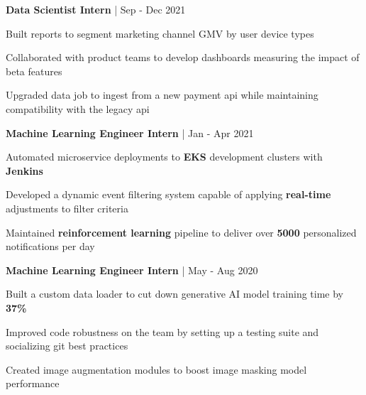 \begin{cventries}

\cventry
{\textbf{Data Scientist Intern} | \color{awesome}{Shopify}}
{Sep - Dec 2021} %
{ %
\begin{cvitems}
\item {Built reports to segment marketing channel GMV by user device types}
\item {Collaborated with product teams to develop dashboards measuring the impact of beta features}
\item {Upgraded data job to ingest from a new payment api while maintaining compatibility with the legacy api}
\end{cvitems}
}

\cventry
{\textbf{Machine Learning Engineer Intern} | \color{awesome}{Zynga}}
{Jan - Apr 2021} %
{ %
\begin{cvitems}
\item {Automated microservice deployments to \textbf{EKS} development clusters with \textbf{Jenkins}}
\item{Developed a dynamic event filtering system capable of applying \textbf{real-time} adjustments to filter criteria}
\item {Maintained \textbf{reinforcement learning} pipeline to deliver over \textbf{5000} personalized notifications per day}
\end{cvitems}
}


\cventry
{\textbf{Machine Learning Engineer Intern} | \color{awesome}{PerkinElmer}}
{May - Aug 2020} %
{ %
\begin{cvitems}
\item {Built a custom data loader to cut down generative AI model training time by \textbf{37\%}}
\item {Improved code robustness on the team by setting up a testing suite and socializing git best practices}
\item {Created image augmentation modules to boost image masking model performance}
\end{cvitems}
}


\end{cventries}
